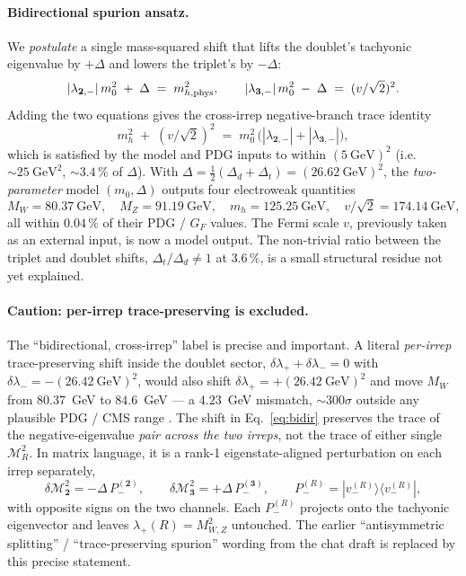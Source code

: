 \documentclass[11pt,a4paper]{article}
\newcommand{\md}{\mathbf{2}}
\newcommand{\mt}{\mathbf{3}}
\begin{document}
\paragraph{Bidirectional spurion ansatz.} We \emph{postulate} a single
mass-squared shift that lifts the doublet's tachyonic eigenvalue by
$+\Delta$ and lowers the triplet's by $-\Delta$:
\begin{equation}
  |\lambda_{\md,-}|\,m_0^2 \;+\; \Delta \;=\; m_{h,{\rm phys}}^2,\qquad
  |\lambda_{\mt,-}|\,m_0^2 \;-\; \Delta \;=\; (v/\sqrt{2})^2.
\label{eq:bidir}
\end{equation}
Adding the two equations gives the cross-irrep negative-branch trace
identity
\begin{equation}
  m_h^2 \;+\; (v/\sqrt{2})^2 \;=\; m_0^2\,\bigl(|\lambda_{\md,-}| + |\lambda_{\mt,-}|\bigr),
\label{eq:trace_id}
\end{equation}
which is satisfied by the model and PDG inputs to within $(5~\text{GeV})^2$
(i.e.\ $\sim 25~\text{GeV}^2$, $\sim 3.4\,\%$ of $\Delta$). With
$\Delta = \tfrac12(\Delta_d + \Delta_t) = (26.62~\text{GeV})^2$, the
\emph{two-parameter} model $(m_0, \Delta)$ outputs four electroweak
quantities
\[
  M_W = 80.37~\text{GeV},\quad M_Z = 91.19~\text{GeV},\quad
  m_h = 125.25~\text{GeV},\quad v/\sqrt{2} = 174.14~\text{GeV},
\]
all within $0.04\,\%$ of their PDG / $G_F$ values. The Fermi scale $v$,
previously taken as an external input, is now a model output. The
non-trivial ratio between the triplet and doublet shifts, $\Delta_t /
\Delta_d \neq 1$ at $3.6\,\%$, is a small structural residue not yet
explained.

\paragraph{Caution: per-irrep trace-preserving is excluded.} The
``bidirectional, cross-irrep'' label is precise and important. A
literal \emph{per-irrep} trace-preserving shift inside the doublet
sector, $\delta\lambda_+ + \delta\lambda_- = 0$ with
$\delta\lambda_- = -(26.42~\text{GeV})^2$, would also shift
$\delta\lambda_+ = +(26.42~\text{GeV})^2$ and move $M_W$ from
$80.37$~GeV to $84.6$~GeV --- a $4.23$~GeV mismatch,
$\sim\!\!300\sigma$ outside any plausible PDG / CMS range
\cite{CMS2026WMass}. The shift in Eq.~\eqref{eq:bidir} preserves the
trace of the negative-eigenvalue \emph{pair across the two irreps}, not
the trace of either single $\mathcal{M}_R^2$. In matrix language, it is
a rank-1 eigenstate-aligned perturbation on each irrep separately,
\begin{equation}
  \delta \mathcal M_{\md}^2 = -\Delta\, P^{(\md)}_-,\qquad
  \delta \mathcal M_{\mt}^2 = +\Delta\, P^{(\mt)}_-,\qquad
  P^{(R)}_- = |v_-^{(R)}\rangle\langle v_-^{(R)}|,
\label{eq:rank1}
\end{equation}
with opposite signs on the two channels. Each $P^{(R)}_-$ projects onto
the tachyonic eigenvector and leaves $\lambda_+(R) = M_{W,Z}^2$
untouched. The earlier ``antisymmetric splitting'' /
``trace-preserving spurion'' wording from the chat draft is replaced by
this precise statement.
\end{document}
